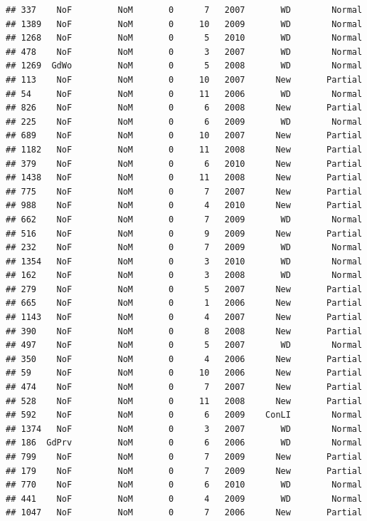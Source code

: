 \documentclass[]{article}
\begin{document}
\begin{verbatim}
## 337    NoF         NoM       0      7   2007       WD        Normal
## 1389   NoF         NoM       0     10   2009       WD        Normal
## 1268   NoF         NoM       0      5   2010       WD        Normal
## 478    NoF         NoM       0      3   2007       WD        Normal
## 1269  GdWo         NoM       0      5   2008       WD        Normal
## 113    NoF         NoM       0     10   2007      New       Partial
## 54     NoF         NoM       0     11   2006       WD        Normal
## 826    NoF         NoM       0      6   2008      New       Partial
## 225    NoF         NoM       0      6   2009       WD        Normal
## 689    NoF         NoM       0     10   2007      New       Partial
## 1182   NoF         NoM       0     11   2008      New       Partial
## 379    NoF         NoM       0      6   2010      New       Partial
## 1438   NoF         NoM       0     11   2008      New       Partial
## 775    NoF         NoM       0      7   2007      New       Partial
## 988    NoF         NoM       0      4   2010      New       Partial
## 662    NoF         NoM       0      7   2009       WD        Normal
## 516    NoF         NoM       0      9   2009      New       Partial
## 232    NoF         NoM       0      7   2009       WD        Normal
## 1354   NoF         NoM       0      3   2010       WD        Normal
## 162    NoF         NoM       0      3   2008       WD        Normal
## 279    NoF         NoM       0      5   2007      New       Partial
## 665    NoF         NoM       0      1   2006      New       Partial
## 1143   NoF         NoM       0      4   2007      New       Partial
## 390    NoF         NoM       0      8   2008      New       Partial
## 497    NoF         NoM       0      5   2007       WD        Normal
## 350    NoF         NoM       0      4   2006      New       Partial
## 59     NoF         NoM       0     10   2006      New       Partial
## 474    NoF         NoM       0      7   2007      New       Partial
## 528    NoF         NoM       0     11   2008      New       Partial
## 592    NoF         NoM       0      6   2009    ConLI        Normal
## 1374   NoF         NoM       0      3   2007       WD        Normal
## 186  GdPrv         NoM       0      6   2006       WD        Normal
## 799    NoF         NoM       0      7   2009      New       Partial
## 179    NoF         NoM       0      7   2009      New       Partial
## 770    NoF         NoM       0      6   2010       WD        Normal
## 441    NoF         NoM       0      4   2009       WD        Normal
## 1047   NoF         NoM       0      7   2006      New       Partial

\end{verbatim}
\end{document}
